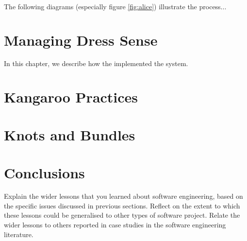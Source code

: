 \documentclass{l3proj}
\begin{document}
The following diagrams (especially figure \ref{fig:alice}) illustrate the
process...

\section{Managing Dress Sense}
\label{managing}

In this chapter, we describe how the implemented the system.

\section{Kangaroo Practices}



\section{Knots and Bundles}
\label{sec:managing}


\section{Conclusions}

Explain the wider lessons that you learned about software engineering,
based on the specific issues discussed in previous sections.  Reflect
on the extent to which these lessons could be generalised to other
types of software project.  Relate the wider lessons to others
reported in case studies in the software engineering literature.



\end{document}
